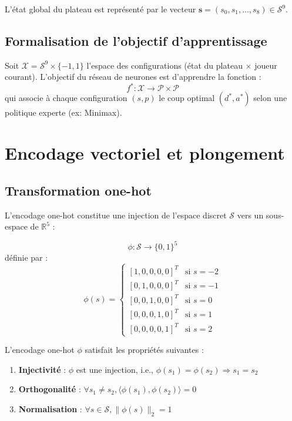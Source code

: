 \documentclass[12pt,a4paper]{report}
\numberwithin{equation}{section}
\begin{document}
L'état global du plateau est représenté par le vecteur $\mathbf{s} = (s_0, s_1, \ldots, s_8) \in \mathcal{S}^9$.

\subsection{Formalisation de l'objectif d'apprentissage}
\begin{theorem}
Soit $\mathcal{X} = \mathcal{S}^9 \times \{-1, 1\}$ l'espace des configurations (état du plateau × joueur courant).
L'objectif du réseau de neurones est d'apprendre la fonction :
$$f^* : \mathcal{X} \rightarrow \mathcal{P} \times \mathcal{P}$$
qui associe à chaque configuration $(s, p)$ le coup optimal $(d^*, a^*)$ selon une politique experte (ex: Minimax).
\end{theorem}

\section{Encodage vectoriel et plongement}

\subsection{Transformation one-hot}
L'encodage one-hot constitue une injection de l'espace discret $\mathcal{S}$ vers un sous-espace de $\mathbb{R}^5$ :

\begin{definition}
$$\phi : \mathcal{S} \rightarrow \{0,1\}^5$$
définie par :
$$\phi(s) = \begin{cases}
[1,0,0,0,0]^T & \text{si } s = -2\\
[0,1,0,0,0]^T & \text{si } s = -1\\
[0,0,1,0,0]^T & \text{si } s = 0\\
[0,0,0,1,0]^T & \text{si } s = 1\\
[0,0,0,0,1]^T & \text{si } s = 2
\end{cases}$$
\end{definition}

\begin{theorem}
L'encodage one-hot $\phi$ satisfait les propriétés suivantes :
\begin{enumerate}
  \item \textbf{Injectivité} : $\phi$ est une injection, i.e., $\phi(s_1) = \phi(s_2) \Rightarrow s_1 = s_2$
  \item \textbf{Orthogonalité} : $\forall s_1 \neq s_2, \langle \phi(s_1), \phi(s_2) \rangle = 0$
  \item \textbf{Normalisation} : $\forall s \in \mathcal{S}, \|\phi(s)\|_2 = 1$
\end{enumerate}
\end{theorem}
\end{document}
